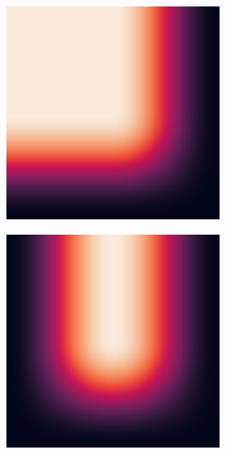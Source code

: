\begin{figure}
  \centering
  \begin{subfigure}{0.5\textwidth}
    \centering
    \begin{subfigure}{.32\textwidth}
      \centering
      \includegraphics[width=\textwidth]{Images/hann_window_00.jpg}
    \end{subfigure}
    \begin{subfigure}{.32\textwidth}
      \centering
      \includegraphics[width=\textwidth]{Images/hann_window_10.jpg}

\end{subfigure}
\end{subfigure}
\end{figure}
